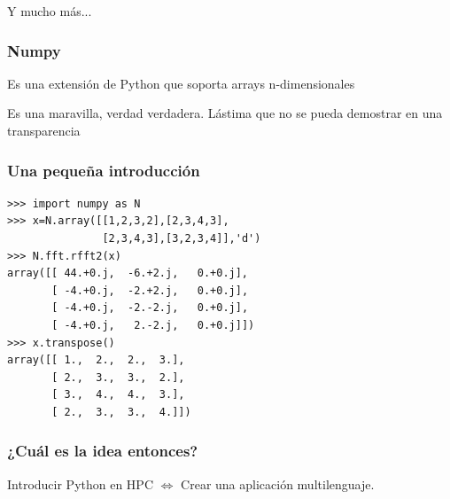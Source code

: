 \documentclass{beamer}
\begin{document}
\begin{frame}
 \begin{center}
 \begin{Huge}
  Y mucho más...
 \end{Huge}
\end{center}
\end{frame}


\begin{frame}
 \frametitle{Numpy}
Es una extensión de Python que soporta arrays n-dimensionales\\
\vspace{2cm}
\begin{large}
Es una maravilla, verdad verdadera. Lástima que no se pueda demostrar en una transparencia 
\end{large}
\end{frame}

\begin{frame}[containsverbatim]
 \frametitle{Una pequeña introducción}
\begin{verbatim}
>>> import numpy as N
>>> x=N.array([[1,2,3,2],[2,3,4,3],
               [2,3,4,3],[3,2,3,4]],'d')
>>> N.fft.rfft2(x)
array([[ 44.+0.j,  -6.+2.j,   0.+0.j],
       [ -4.+0.j,  -2.+2.j,   0.+0.j],
       [ -4.+0.j,  -2.-2.j,   0.+0.j],
       [ -4.+0.j,   2.-2.j,   0.+0.j]])
>>> x.transpose()
array([[ 1.,  2.,  2.,  3.],
       [ 2.,  3.,  3.,  2.],
       [ 3.,  4.,  4.,  3.],
       [ 2.,  3.,  3.,  4.]])
\end{verbatim}
\end{frame}

\begin{frame}
 \frametitle{¿Cuál es la idea entonces?}
Introducir Python en HPC $\Leftrightarrow$ Crear una aplicación multilenguaje.

\begin{center}

\end{center}


\end{frame}
\end{document}
